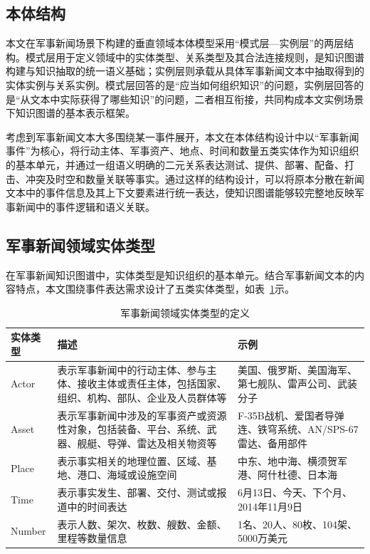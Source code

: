 \subsection{本体结构}

本文在军事新闻场景下构建的垂直领域本体模型采用“模式层—实例层”的两层结构。模式层用于定义领域中的实体类型、关系类型及其合法连接规则，是知识图谱构建与知识抽取的统一语义基础；实例层则承载从具体军事新闻文本中抽取得到的实体实例与关系实例。模式层回答的是“应当如何组织知识”的问题，实例层回答的是“从文本中实际获得了哪些知识”的问题，二者相互衔接，共同构成本文实例场景下知识图谱的基本表示框架。

考虑到军事新闻文本大多围绕某一事件展开，本文在本体结构设计中以“军事新闻事件”为核心，将行动主体、军事资产、地点、时间和数量五类实体作为知识组织的基本单元，并通过一组语义明确的二元关系表达测试、提供、部署、配备、打击、冲突及时空和数量关联等事实。通过这样的结构设计，可以将原本分散在新闻文本中的事件信息及其上下文要素进行统一表达，使知识图谱能够较完整地反映军事新闻中的事件逻辑和语义关联。

\subsection{军事新闻领域实体类型}

在军事新闻知识图谱中，实体类型是知识组织的基本单元。结合军事新闻文本的内容特点，本文围绕事件表达需求设计了五类实体类型，如表~\ref{tab:military_news_entity_types}示。

\begin{table}[htbp]
  \centering
  \caption{军事新闻领域实体类型的定义}
  \label{tab:military_news_entity_types}
  {
  \small
  \begin{tabularx}{0.96\textwidth}{
    >{\raggedright\arraybackslash}p{}
    >{\raggedright\arraybackslash}X
    >{\raggedright\arraybackslash}p{}
  }
    \toprule
    实体类型 & 描述 & 示例 \\
    \midrule
    Actor
    & 表示军事新闻中的行动主体、参与主体、接收主体或责任主体，包括国家、组织、机构、部队、企业及人员群体等
    & 美国、俄罗斯、美国海军、第七舰队、雷声公司、武装分子 \\

    Asset
    & 表示军事新闻中涉及的军事资产或资源性对象，包括装备、平台、系统、武器、舰艇、导弹、雷达及相关物资等
    & F-35B战机、爱国者导弹连、铁穹系统、AN/SPS-67雷达、备用部件 \\

    Place
    & 表示事实相关的地理位置、区域、基地、港口、海域或设施空间
    & 中东、地中海、横须贺军港、阿什杜德、日本海 \\

    Time
    & 表示事实发生、部署、交付、测试或报道中的时间表达
    & 6月13日、今天、下个月、2014年11月9日 \\

    Number
    & 表示人数、架次、枚数、艘数、金额、里程等数量信息
    & 1名、20人、80枚、104架、5000万美元 \\
    \bottomrule
  \end{tabularx}}
\end{table}

